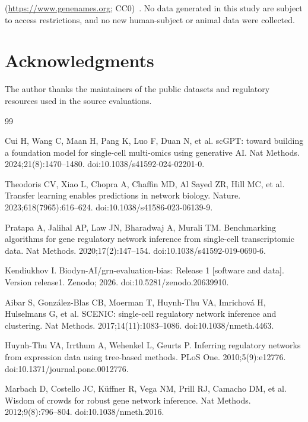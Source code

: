 \documentclass[10pt,letterpaper]{article}
\begin{document}
(\url{https://www.genenames.org}; CC0)~\cite{seal2023hgnc}. No data generated in this study are subject to access restrictions, and no new human-subject or animal data were collected.

\section*{Acknowledgments}
The author thanks the maintainers of the public datasets and regulatory resources used in the source evaluations.

\nolinenumbers

\begin{thebibliography}{99}

Cui H, Wang C, Maan H, Pang K, Luo F, Duan N, et al. scGPT: toward building a foundation model for single-cell multi-omics using generative AI. Nat Methods. 2024;21(8):1470--1480. doi:10.1038/s41592-024-02201-0.

Theodoris CV, Xiao L, Chopra A, Chaffin MD, Al Sayed ZR, Hill MC, et al. Transfer learning enables predictions in network biology. Nature. 2023;618(7965):616--624. doi:10.1038/s41586-023-06139-9.

Pratapa A, Jalihal AP, Law JN, Bharadwaj A, Murali TM. Benchmarking algorithms for gene regulatory network inference from single-cell transcriptomic data. Nat Methods. 2020;17(2):147--154. doi:10.1038/s41592-019-0690-6.

Kendiukhov I. Biodyn-AI/grn-evaluation-bias: Release 1 [software and data]. Version release1. Zenodo; 2026. doi:10.5281/zenodo.20639910.

Aibar S, Gonz\'alez-Blas CB, Moerman T, Huynh-Thu VA, Imrichov\'a H, Hulselmans G, et al. SCENIC: single-cell regulatory network inference and clustering. Nat Methods. 2017;14(11):1083--1086. doi:10.1038/nmeth.4463.

Huynh-Thu VA, Irrthum A, Wehenkel L, Geurts P. Inferring regulatory networks from expression data using tree-based methods. PLoS One. 2010;5(9):e12776. doi:10.1371/journal.pone.0012776.

Marbach D, Costello JC, K\"uffner R, Vega NM, Prill RJ, Camacho DM, et al. Wisdom of crowds for robust gene network inference. Nat Methods. 2012;9(8):796--804. doi:10.1038/nmeth.2016.


\end{thebibliography}
\end{document}
